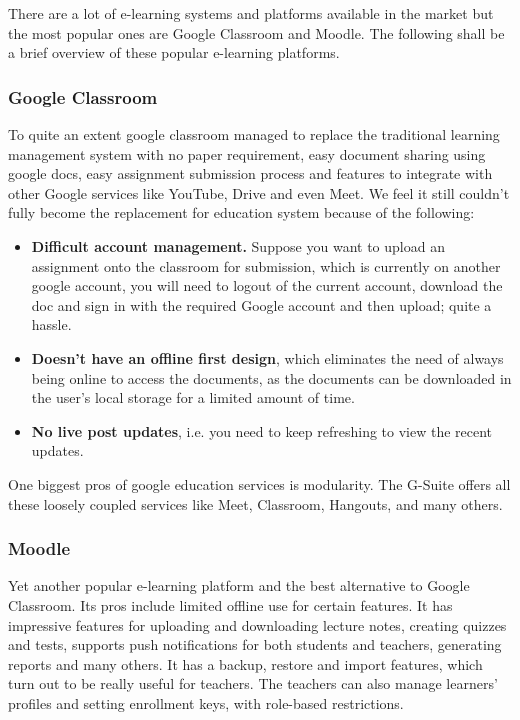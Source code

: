 There are a lot of e-learning systems and platforms available in the market 
but the most popular ones are Google Classroom and Moodle. 
The following shall be a brief overview of these popular e-learning platforms.

\subsubsection{Google Classroom}
To quite an extent google classroom managed to replace the traditional 
learning management system with no paper requirement, easy document sharing using google docs, 
easy assignment submission process and features to integrate with other Google services 
like YouTube, Drive and even Meet. 
We feel it still couldn’t fully become the replacement for education system because of the following:

\begin{itemize}
    \item \textbf{Difficult account management.} Suppose you want to upload an assignment onto the classroom for submission, 
    which is currently on another google account, you will need to logout of the current account, 
    download the doc and sign in with the required Google account and then upload; quite a hassle.
    \item \textbf{Doesn’t have an offline first design}, which eliminates the need of always being online to access the documents, 
    as the documents can be downloaded in the user’s local storage for a limited amount of time.
    \item \textbf{No live post updates}, i.e. you need to keep refreshing to view the recent updates.
\end{itemize}

One biggest pros of google education services is modularity. The G-Suite offers all these 
loosely coupled services like Meet, Classroom, Hangouts, and many others.

\subsubsection{Moodle}
Yet another popular e-learning platform and the best alternative to Google Classroom. 
Its pros include limited offline use for certain features. It has impressive features 
for  uploading and downloading lecture notes, creating quizzes and tests, supports push 
notifications for both students and teachers, generating reports and many others. 
It has a  backup, restore and import features, which turn out to be really useful for teachers. 
The teachers can also manage learners' profiles and setting enrollment keys, with role-based restrictions.

